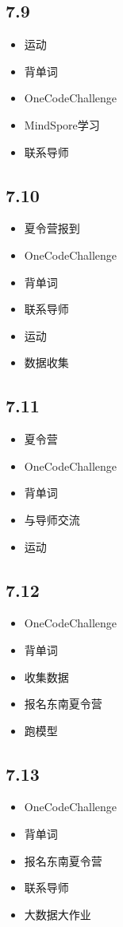 \documentclass[UTF8]{ctexart}
\begin{document}
\subsection*{7.9}
\begin{itemize}
    \item 运动
    \item 背单词
    \item OneCodeChallenge
    \item MindSpore学习
    \item 联系导师
\end{itemize}

\subsection*{7.10}
\begin{itemize}
    \item 夏令营报到
    \item OneCodeChallenge
    \item 背单词
    \item 联系导师
    \item 运动
    \item 数据收集
\end{itemize}

\subsection*{7.11}
\begin{itemize}
    \item 夏令营
    \item OneCodeChallenge
    \item 背单词
    \item 与导师交流
    \item 运动
\end{itemize}

\subsection*{7.12}
\begin{itemize}
    \item OneCodeChallenge
    \item 背单词
    \item 收集数据
    \item 报名东南夏令营
    \item 跑模型
\end{itemize}

\subsection*{7.13}
\begin{itemize}
    \item OneCodeChallenge
    \item 背单词
    \item 报名东南夏令营
    \item 联系导师
    \item 大数据大作业
\end{itemize}
\end{document}
